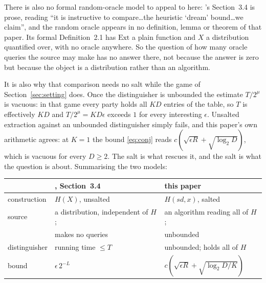 \documentclass{aicr-solution}
\newcommand{\sd}{\mathit{sd}}
\begin{document}
\begin{remark}
There is also no formal random-oracle model to appeal to here: \cite{BDKPPSY11}'s Section~3.4 is
prose, reading ``it is instructive to compare\ldots the heuristic `dream' bound\ldots we claim'',
and the random oracle appears in no definition, lemma or theorem of that paper. Its formal
Definition~2.1 has $\mathrm{Ext}$ a plain function and $X$ a distribution quantified over, with no
oracle anywhere. So the question of how many oracle queries the source may make has no answer
there, not because the answer is zero but because the object is a distribution rather than an
algorithm.

It is also why that comparison needs no salt while the game of Section~\ref{sec:setting} does. Once
the distinguisher is unbounded the estimate $T/2^{\mu}$ is vacuous: in that game every party holds
all $KD$ entries of the table, so $T$ is effectively $KD$ and $T/2^{\mu} = KD\epsilon$ exceeds $1$
for every interesting $\epsilon$. Unsalted extraction against an unbounded distinguisher simply
fails, and this paper's own arithmetic agrees: at $K = 1$ the bound \eqref{eq:conj} reads
$c(\sqrt{\epsilon R} + \sqrt{\log_2 D})$, which is vacuous for every $D \ge 2$. The salt is what
rescues it, and the salt is what the question is about. Summarising the two models:
\begin{center}\small
\begin{tabular}{@{}lll@{}}
\toprule
 & \cite{BDKPPSY11}, Section~3.4 & this paper \\
\midrule
construction   & $H(X)$, unsalted                        & $H(\sd,x)$, salted \\
source         & a distribution, independent of $H$;     & an algorithm reading all of $H$; \\
               & makes no queries                        & unbounded \\
distinguisher  & running time $\le T$                    & unbounded; holds all of $H$ \\
bound          & $\epsilon\,2^{-L}$                      & $c(\sqrt{\epsilon R} + \sqrt{\log_2 D / K})$ \\
\bottomrule
\end{tabular}
\end{center}
\end{remark}
\end{document}
